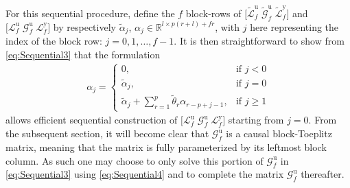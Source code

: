For this sequential procedure, define the $f$ block-rows of $\big[\widetilde{\mathcal{L}}^\mathrm{u}_f \; \widetilde{\mathcal{G}}^\mathrm{u}_f \; \widetilde{\mathcal{L}}^\mathrm{y}_f\big]$ and $\big[\mathcal{L}^\mathrm{u}_f \; \mathcal{G}^\mathrm{u}_f \; \mathcal{L}^\mathrm{y}_f\big]$ by respectively $\tilde{\alpha}_j$, ${\alpha_j\in\mathbb{R}^{l\times p(r+l)+fr}}$, with $j$ here representing the index of the block row: $j=0,1,\dots,f-1$. It is then straightforward to show from \eqref{eq:Sequential3} that the formulation
\begin{align}\label{eq:Sequential4}
    \alpha_j=
    \left\{\begin{array}{ll}
    0          ,     & \text{if } j<0\\
    \tilde{\alpha}_j,& \text{if } j=0\\
    \tilde{\alpha}_j + \sum\limits_{r=1}^{p}\tilde{\theta}_r\alpha_{r-p+j-1}, & \text{if } j \geq 1
    \end{array}\right.
\end{align}
 allows efficient sequential construction of $\big[\mathcal{L}^\mathrm{u}_f \; \mathcal{G}^\mathrm{u}_f \; \mathcal{L}^\mathrm{y}_f\big]$ starting from $j=0$. From the subsequent section, it will become clear that $\mathcal{G}^\mathrm{u}_f$ is a causal block-Toeplitz matrix, meaning that the matrix is fully parameterized by its leftmost block column. As such one may choose to only solve this portion of $\mathcal{G}^\mathrm{u}_f$ in \eqref{eq:Sequential3} using \eqref{eq:Sequential4} and to complete the matrix $\mathcal{G}^\mathrm{u}_f$ thereafter.